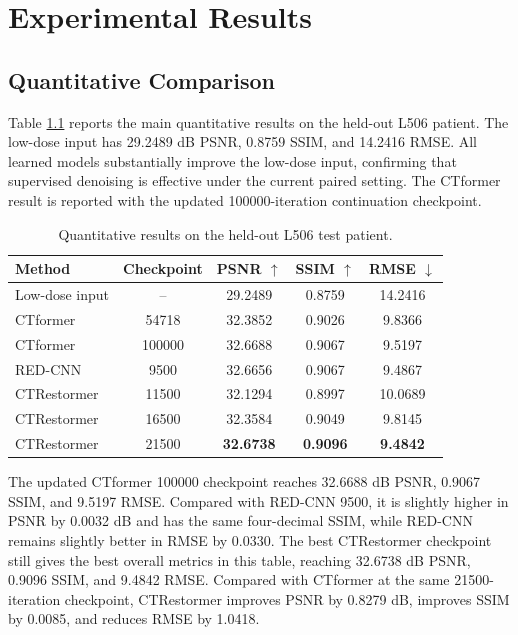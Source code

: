 \chapter{Experimental Results}

\section{Quantitative Comparison}

Table \ref{tab:main_results} reports the main quantitative results on the held-out L506 patient. The low-dose input has 29.2489 dB PSNR, 0.8759 SSIM, and 14.2416 RMSE. All learned models substantially improve the low-dose input, confirming that supervised denoising is effective under the current paired setting. The CTformer result is reported with the updated 100000-iteration continuation checkpoint.

\begin{table}[!htbp]
    \centering
    \caption{Quantitative results on the held-out L506 test patient.}
    \renewcommand{\arraystretch}{1.25}
    \small
    \begin{tabular}{lcccc}
        \hline
        Method & Checkpoint & PSNR \(\uparrow\) & SSIM \(\uparrow\) & RMSE \(\downarrow\) \\
        \hline
        Low-dose input & -- & 29.2489 & 0.8759 & 14.2416 \\
        \hline
        CTformer & 54718 & 32.3852 & 0.9026 & 9.8366 \\
        \hline
        CTformer & 100000 & 32.6688 & 0.9067 & 9.5197 \\
        \hline
        RED-CNN & 9500 & 32.6656 & 0.9067 & 9.4867 \\
        \hline
        CTRestormer & 11500 & 32.1294 & 0.8997 & 10.0689 \\
        \hline
        CTRestormer & 16500 & 32.3584 & 0.9049 & 9.8145 \\
        \hline
        CTRestormer & 21500 & \textbf{32.6738} & \textbf{0.9096} & \textbf{9.4842} \\
        \hline
    \end{tabular}
    \label{tab:main_results}
\end{table}

The updated CTformer 100000 checkpoint reaches 32.6688 dB PSNR, 0.9067 SSIM, and 9.5197 RMSE. Compared with RED-CNN 9500, it is slightly higher in PSNR by 0.0032 dB and has the same four-decimal SSIM, while RED-CNN remains slightly better in RMSE by 0.0330. The best CTRestormer checkpoint still gives the best overall metrics in this table, reaching 32.6738 dB PSNR, 0.9096 SSIM, and 9.4842 RMSE. Compared with CTformer at the same 21500-iteration checkpoint, CTRestormer improves PSNR by 0.8279 dB, improves SSIM by 0.0085, and reduces RMSE by 1.0418.

